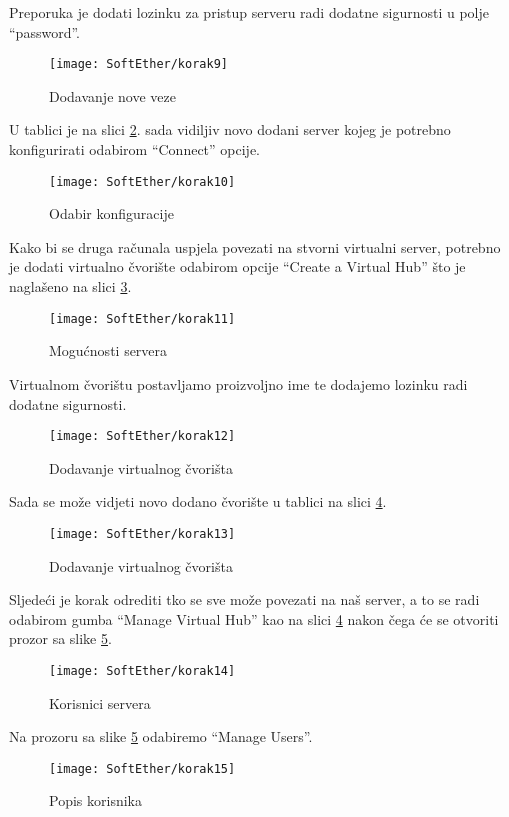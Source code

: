 Preporuka je dodati lozinku za pristup serveru radi dodatne sigurnosti u polje ``password''.
\begin{figure}[h!]
     \centering
     \texttt{[image: SoftEther/korak9]}
     \caption{Dodavanje nove veze}
     \label{fig:novaveza-soft}
\end{figure}
\FloatBarrier
U tablici je na slici \ref{fig:konf-soft}. sada vidiljiv novo dodani server kojeg je potrebno konfigurirati odabirom ``Connect'' opcije.
\begin{figure}[h!]
     \centering
     \texttt{[image: SoftEther/korak10]}
     \caption{Odabir konfiguracije}
     \label{fig:konf-soft}
\end{figure}
\FloatBarrier
Kako bi se druga računala uspjela povezati na stvorni virtualni server, potrebno je dodati virtualno čvorište odabirom opcije ``Create a Virtual Hub'' što je naglašeno na slici \ref{fig:mogu-soft}.
\begin{figure}[h!]
     \centering
     \texttt{[image: SoftEther/korak11]}
     \caption{Mogućnosti servera}
     \label{fig:mogu-soft}
\end{figure}
\FloatBarrier
Virtualnom čvorištu postavljamo proizvoljno ime te dodajemo lozinku radi dodatne sigurnosti.
\begin{figure}[h!]
     \centering
     \texttt{[image: SoftEther/korak12]}
     \caption{Dodavanje virtualnog čvorišta}
\end{figure}
\FloatBarrier
Sada se može vidjeti novo dodano čvorište u tablici na slici \ref{fig:list-soft}.
\begin{figure}[h!]
     \centering
     \texttt{[image: SoftEther/korak13]}
     \caption{Dodavanje virtualnog čvorišta}
     \label{fig:list-soft}
\end{figure}
\FloatBarrier
Sljedeći je korak odrediti tko se sve može povezati na naš server, a to se radi odabirom gumba ``Manage Virtual Hub'' kao na slici \ref{fig:list-soft} nakon čega će se otvoriti prozor sa slike \ref{fig:users-soft}.
\begin{figure}[h!]
     \centering
     \texttt{[image: SoftEther/korak14]}
     \caption{Korisnici servera}
     \label{fig:users-soft}
\end{figure}
\FloatBarrier
Na prozoru sa slike \ref{fig:users-soft} odabiremo ``Manage Users''.
\begin{figure}[h!]
     \centering
     \texttt{[image: SoftEther/korak15]}
     \caption{Popis korisnika}
\end{figure}
